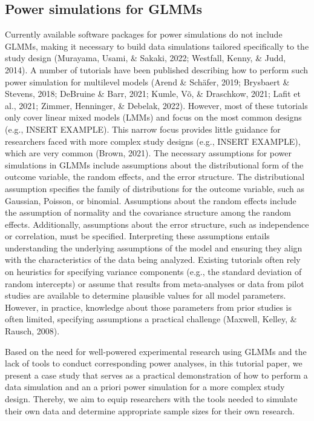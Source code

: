 \documentclass[
  man,floatsintext]{apa6}
\begin{document}
\hypertarget{power-simulations-for-glmms}{%
\subsection{Power simulations for GLMMs}\label{power-simulations-for-glmms}}

Currently available software packages for power simulations do not include GLMMs, making it necessary to build data simulations tailored specifically to the study design (Murayama, Usami, \& Sakaki, 2022; Westfall, Kenny, \& Judd, 2014).
A number of tutorials have been published describing how to perform such power simulation for multilevel models (Arend \& Schäfer, 2019; Brysbaert \& Stevens, 2018; DeBruine \& Barr, 2021; Kumle, Võ, \& Draschkow, 2021; Lafit et al., 2021; Zimmer, Henninger, \& Debelak, 2022).
However, most of these tutorials only cover linear mixed models (LMMs) and focus on the most common designs (e.g., INSERT EXAMPLE). This narrow focus provides little guidance for researchers faced with more complex study designs (e.g., INSERT EXAMPLE), which are very common (Brown, 2021).
The necessary assumptions for power simulations in GLMMs include assumptions about the distributional form of the outcome variable, the random effects, and the error structure. The distributional assumption specifies the family of distributions for the outcome variable, such as Gaussian, Poisson, or binomial. Assumptions about the random effects include the assumption of normality and the covariance structure among the random effects. Additionally, assumptions about the error structure, such as independence or correlation, must be specified. Interpreting these assumptions entails understanding the underlying assumptions of the model and ensuring they align with the characteristics of the data being analyzed.
Existing tutorials often rely on heuristics for specifying variance components (e.g., the standard deviation of random intercepts) or assume that results from meta-analyses or data from pilot studies are available to determine plausible values for all model parameters. However, in practice, knowledge about those parameters from prior studies is often limited, specifying assumptions a practical challenge (Maxwell, Kelley, \& Rausch, 2008).

Based on the need for well-powered experimental research using GLMMs and the lack of tools to conduct corresponding power analyses, in this tutorial paper, we present a case study that serves as a practical demonstration of how to perform a data simulation and an a priori power simulation for a more complex study design. Thereby, we aim to equip researchers with the tools needed to simulate their own data and determine appropriate sample sizes for their own research.
\end{document}

